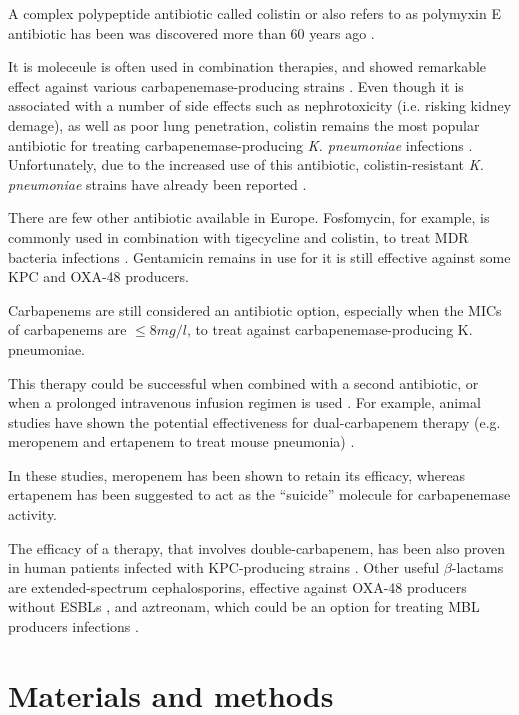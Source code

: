 \documentclass[11pt]{report}
\begin{document}
A complex polypeptide antibiotic called colistin or also refers to as polymyxin E antibiotic has been was discovered more than 60 years ago \cite{karaiskos2014multidrug, rodriguez2015diagnosis}.

It is moleceule is often used in combination therapies, and showed remarkable effect against various carbapenemase-producing strains \cite{falagas2013antibiotic, temkin2014carbapenem}.
Even though it is associated with a number of side effects such as nephrotoxicity (i.e. risking kidney demage), as well as poor lung penetration, colistin remains the most popular antibiotic for treating carbapenemase-producing \emph{K. pneumoniae} infections \cite{karaiskos2014multidrug, rodriguez2015diagnosis}.
Unfortunately, due to the increased use of this antibiotic, 
colistin-resistant \emph{K. pneumoniae} strains have already been reported \cite{mammina2012ongoing}.

There are few other antibiotic available in Europe. Fosfomycin, for example, is commonly used in combination with tigecycline and colistin, to treat MDR bacteria infections \cite{pontikis2014outcomes}.
Gentamicin remains in use for it is still effective against some KPC and OXA-48 producers.

Carbapenems are still considered an antibiotic option, especially when the MICs of carbapenems are $\le 8mg/l$, to treat against carbapenemase-producing K. pneumoniae.

This therapy could be successful when combined with a second antibiotic, or when a prolonged intravenous infusion regimen is used \cite{tzouvelekis2014treating, daikos2014carbapenemase, tumbarello2012predictors}.
For example, animal studies have shown the potential effectiveness for dual-carbapenem therapy (e.g. meropenem and ertapenem to treat mouse pneumonia) 
\cite{wiskirchen2014vivo}.

In these studies, meropenem has been shown to retain its efficacy, whereas ertapenem has been suggested to act as the ``suicide'' molecule for carbapenemase activity.

The efficacy of a therapy, that involves double-carbapenem, has been also proven in human patients infected with KPC-producing strains \cite{giamarellou2013effectiveness}.
Other useful $\beta$-lactams are extended-spectrum cephalosporins, effective against OXA-48 producers without ESBLs \cite{mimoz2012broad}, and aztreonam, which could be an option for treating MBL producers infections \cite{nordmann2011emerging}.

\chapter{Materials and methods}
\end{document}
